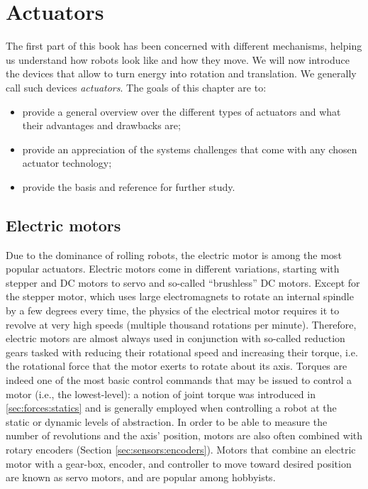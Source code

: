 \chapter{Actuators}

The first part of this book has been concerned with different mechanisms, helping us understand how robots look like and how they move. We will now introduce the devices that allow to turn energy into rotation and translation. We generally call such devices \textsl{actuators}. The goals of this chapter are to:

\begin{itemize}
\item provide a general overview over the different types of actuators and what their advantages and drawbacks are;
\item provide an appreciation of the systems challenges that come with any chosen actuator technology;
\item provide the basis and reference for further study.
\end{itemize}

\section{Electric motors}

Due to the dominance of rolling robots, the electric motor \cite{hughes2019electric} is among the most popular actuators. Electric motors come in different variations, starting with stepper and DC motors to servo and so-called ``brushless'' DC motors. Except for the stepper motor, which uses large electromagnets to rotate an internal spindle by a few degrees every time, the physics of the electrical motor requires it to revolve at very high speeds (multiple thousand rotations per minute). Therefore, electric motors are almost always used in conjunction with so-called reduction gears tasked with reducing their rotational speed and increasing their torque, i.e. the rotational force that the motor exerts to rotate about its axis.
Torques are indeed one of the most basic control commands that may be issued to control a motor (i.e., the lowest-level): a notion of joint torque was introduced in \cref{sec:forces:statics} and is generally employed when controlling a robot at the static or dynamic levels of abstraction.
In order to be able to measure the number of revolutions and the axis' position, motors are also often combined with rotary encoders (Section \ref{sec:sensors:encoders}). Motors that combine an electric motor with a gear-box, encoder, and controller to move toward desired position are known as servo motors, and are popular among hobbyists.

